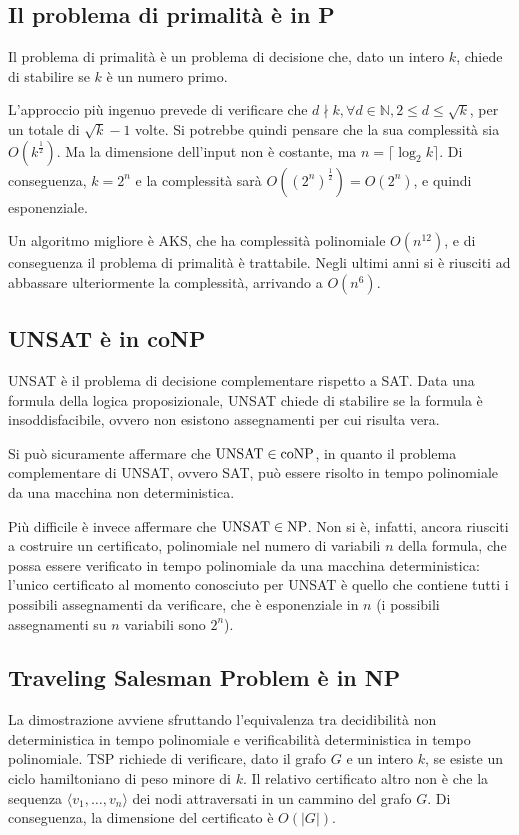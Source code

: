 \subsection{Il problema di primalità è in P}
Il problema di primalità è un problema di decisione che, dato un intero $k$, chiede di stabilire se $k$ è un numero primo.

L'approccio più ingenuo prevede di verificare che $d \nmid k, \forall d \in \mathbb{N}, 2 \le d \le \sqrt{k}$, per un totale di $\sqrt{k} - 1$ volte.
Si potrebbe quindi pensare che la sua complessità sia $O(k^{\frac{1}{2}})$. Ma la dimensione dell'input non è costante, ma $n = \lceil \log_2 k \rceil$.
Di conseguenza, $k = 2^n$ e la complessità sarà $O({(2^n)}^\frac{1}{2}) = O(2^n)$, e quindi esponenziale.

Un algoritmo migliore è AKS, che ha complessità polinomiale $O(n^12)$, e di conseguenza il problema di primalità è trattabile.
Negli ultimi anni si è riusciti ad abbassare ulteriormente la complessità, arrivando a $O(n^6)$.

\subsection{UNSAT è in coNP}
UNSAT è il problema di decisione complementare rispetto a SAT.
Data una formula della logica proposizionale, UNSAT chiede di stabilire se la formula è insoddisfacibile, ovvero non esistono assegnamenti per cui risulta vera.

Si può sicuramente affermare che $\textnormal{UNSAT} \in \textnormal{coNP}$, in quanto il problema complementare di UNSAT, ovvero SAT, può essere risolto in tempo polinomiale da una macchina non deterministica.

Più difficile è invece affermare che $\textnormal{UNSAT} \in \textnormal{NP}$. Non si è, infatti, ancora riusciti a costruire un certificato, polinomiale nel numero di variabili $n$ della formula, che possa essere verificato in tempo polinomiale da una macchina deterministica: l'unico certificato al momento conosciuto per UNSAT è quello che contiene tutti i possibili assegnamenti da verificare, che è esponenziale in $n$ (i possibili assegnamenti su $n$ variabili sono $2^n$).

\subsection{Traveling Salesman Problem è in NP}
La dimostrazione avviene sfruttando l'equivalenza tra decidibilità non deterministica in tempo polinomiale e verificabilità deterministica in tempo polinomiale.
TSP richiede di verificare, dato il grafo $G$ e un intero $k$, se esiste un ciclo hamiltoniano di peso minore di $k$.
Il relativo certificato altro non è che la sequenza $\langle v_1, \ldots, v_n \rangle$ dei nodi attraversati in un cammino del grafo $G$.
Di conseguenza, la dimensione del certificato è $O(|G|)$.

